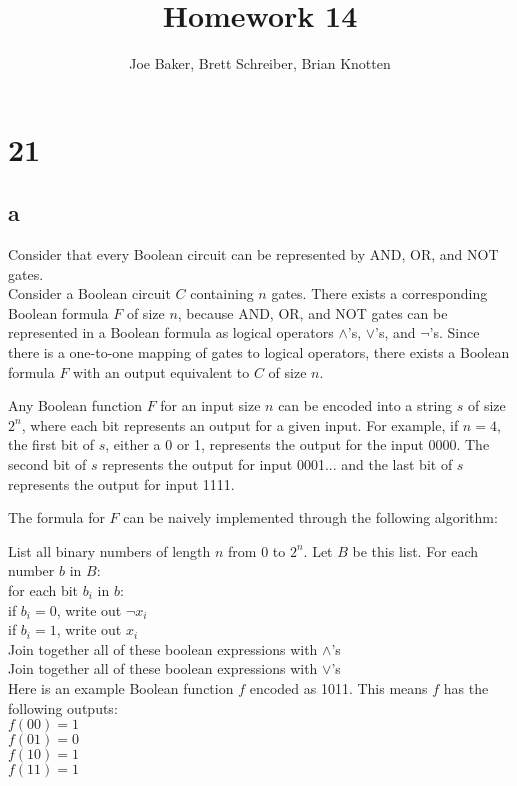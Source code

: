 \documentclass[letterpaper,notitlepage,twoside]{article}
\newcommand\tab[1][1cm]{\hspace*{#1}} %
\begin{document}
\title{Homework 14}
\author{Joe Baker, Brett Schreiber, Brian Knotten}
\maketitle

\section*{21}

\subsection*{a}
Consider that every Boolean circuit can be represented by AND, OR, and NOT gates. \\
Consider a Boolean circuit $C$ containing $n$ gates. There exists a corresponding Boolean formula $F$ of size $n$, because AND, OR, and NOT gates can be represented in a Boolean formula as logical operators $\land$'s, $\lor$'s, and $\neg$'s. Since there is a one-to-one mapping of gates to logical operators, there exists a Boolean formula $F$ with an output equivalent to $C$ of size $n$.

Any Boolean function $F$ for an input size $n$ can be encoded into a string $s$ of size $2^n$, where each bit represents an output for a given input. For example, if $n = 4$, the first bit of $s$, either a 0 or 1, represents the output for the input 0000. The second bit of $s$ represents the output for input 0001... and the last bit of $s$ represents the output for input 1111.

The formula for $F$ can be naively implemented through the following algorithm:

List all binary numbers of length $n$ from $0$ to $2^n$. Let $B$ be this list.
For each number $b$ in $B$: \\
\tab for each bit $b_i$ in $b$: \\
\tab\tab if $b_i = 0$, write out $\neg x_i$ \\
\tab\tab if $b_i = 1$, write out $x_i$ \\
\tab Join together all of these boolean expressions with $\land$'s \\
Join together all of these boolean expressions with $\lor$'s \\

Here is an example Boolean function $f$ encoded as 1011. This means $f$ has the following outputs: \\
$f(00) = 1$ \\
$f(01) = 0$ \\
$f(10) = 1$ \\
$f(11) = 1$ \\
\end{document}
